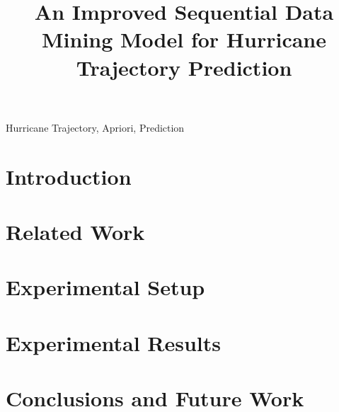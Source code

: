 \documentclass[conference]{IEEEtran}
\begin{document}
\raggedbottom

\title{An Improved Sequential Data Mining Model for Hurricane Trajectory Prediction}


\author{
}

\maketitle

\begin{abstract}

\end{abstract}

\begin{IEEEkeywords}
Hurricane Trajectory, Apriori, Prediction
\end{IEEEkeywords}

\IEEEpeerreviewmaketitle

\section{Introduction}

\section{Related Work}


\section{Experimental Setup}


\section{Experimental Results}

\section{Conclusions and Future Work} %

\begin{thebibliography}{1}
\bibitem{} 
\bibitem{} 
\bibitem{} 
\bibitem{} 
\bibitem{} 
\bibitem{} 
\bibitem{} 
\bibitem{} 
\bibitem{} 
\bibitem{} 
\end{thebibliography}
\end{document}
